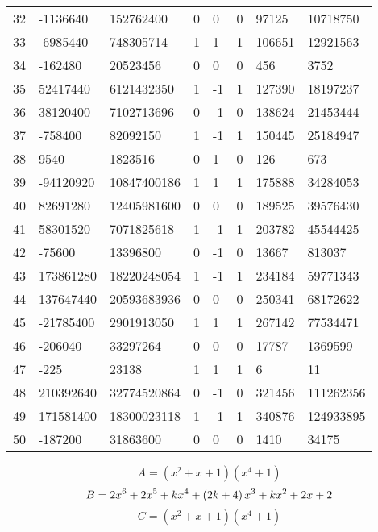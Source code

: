 \documentclass{amsart}
\begin{document}
\begin{longtable}{|l|l|l|lllll|}
32&-1136640&152762400&0&0&0&97125&10718750\\
33&-6985440&748305714&1&1&1&106651&12921563\\
34&-162480&20523456&0&0&0&456&3752\\
35&52417440&6121432350&1&-1&1&127390&18197237\\
36&38120400&7102713696&0&-1&0&138624&21453444\\
37&-758400&82092150&1&-1&1&150445&25184947\\
38&9540&1823516&0&1&0&126&673\\
39&-94120920&10847400186&1&1&1&175888&34284053\\
40&82691280&12405981600&0&0&0&189525&39576430\\
41&58301520&7071825618&1&-1&1&203782&45544425\\
42&-75600&13396800&0&-1&0&13667&813037\\
43&173861280&18220248054&1&-1&1&234184&59771343\\
44&137647440&20593683936&0&0&0&250341&68172622\\
45&-21785400&2901913050&1&1&1&267142&77534471\\
46&-206040&33297264&0&0&0&17787&1369599\\
47&-225&23138&1&1&1&6&11\\
48&210392640&32774520864&0&-1&0&321456&111262356\\
49&171581400&18300023118&1&-1&1&340876&124933895\\
50&-187200&31863600&0&0&0&1410&34175\\
\hline
\end{longtable}
$$A=(x^2
 + x
 + 1)(x^4
 + 1)$$
$$B=2\*x^6
 + 2\*x^5
 + k\*x^4
 + \left(2\*k
 + 4\right) \*x^3
 + k\*x^2
 + 2\*x
 + 2$$
$$C=(x^2
 + x
 + 1)(x^4
 + 1)$$
\end{document}
